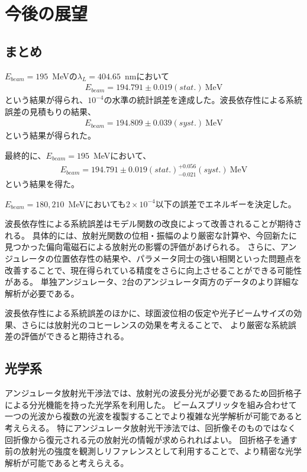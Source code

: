 \documentclass[a4paper,11pt,uplatex]{jsbook}
\begin{document}
\chapter{今後の展望}
\section{まとめ}
$E_{beam}=195$~MeVの$\lambda_L=404.65$~nmにおいて
\begin{align}
  E_{beam} = 194.791 \pm 0.019(stat.) ~\text{MeV}
\end{align}
という結果が得られ、$10^{-4}$の水準の統計誤差を達成した。波長依存性による系統誤差の見積もりの結果、
\begin{align}
  E_{beam} = 194.809 \pm 0.039(syst.) ~\text{MeV}
\end{align}
という結果が得られた。

最終的に、$E_{beam}=195$~MeVにおいて、
\begin{align}
  E_{beam} = 194.791 \pm 0.019(stat.) ^{+0.056}_{-0.021}(syst.) ~\text{MeV}
\end{align}
という結果を得た。

$E_{beam} = 180, 210$~MeVにおいても$2\times10^{-4}$以下の誤差でエネルギーを決定した。

波長依存性による系統誤差はモデル関数の改良によって改善されることが期待される。
具体的には、放射光関数の位相・振幅のより厳密な計算や、今回新たに見つかった偏向電磁石による放射光の影響の評価があげられる。
さらに、アンジュレータの位置依存性の結果や、パラメータ同士の強い相関といった問題点を改善することで、現在得られている精度をさらに向上させることができる可能性がある。
単独アンジュレータ、2台のアンジュレータ両方のデータのより詳細な解析が必要である。

波長依存性による系統誤差のほかに、球面波位相の仮定や光子ビームサイズの効果、さらには放射光のコヒーレンスの効果を考えることで、
より厳密な系統誤差の評価ができると期待される。
\section{光学系}
アンジュレータ放射光干渉法では、放射光の波長分光が必要であるため回折格子による分光機能を持った光学系を利用した。
ビームスプリッタを組み合わせて一つの光波から複数の光波を複製することでより複雑な光学解析が可能であると考えらえる。
特にアンジュレータ放射光干渉法では、回折像そのものではなく回折像から復元される元の放射光の情報が求められればよい。
回折格子を通す前の放射光の強度を観測しリファレンスとして利用することで、より精密な光学解析が可能であると考えらえる。
\end{document}
